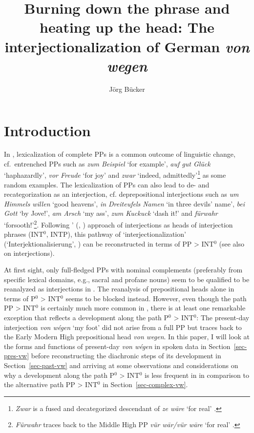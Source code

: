 \documentclass[output=paper
  ,nobabel
  ,draftmode
  ,babelshorthands
  ,colorlinks, citecolor=brown
]{langscibook}
\title[Burning down the phrase and heating up the head]{Burning down the phrase and heating up the head: The interjectionalization of German \emph{von wegen}}
\author{Jörg Bücker\orcid{0000-0003-4864-3374}\affiliation{Heinrich-Heine-Universität Düsseldorf}}
\begin{document}
\maketitle


\section{Introduction}\label{sec-intro-büc}

In , lexicalization of complete PPs is a common outcome of linguistic change, cf.\ entrenched PPs such as \emph{zum Beispiel} `for example', \emph{auf gut Glück} `haphazardly', \emph{vor Freude} `for joy'
and \emph{zwar} `indeed, admittedly'\footnote{\emph{Zwar} is a fused and decategorized descendant of \emph{ze wāre} `for real' \citep[cf.][1020]{Kluge2002}.}
as some random examples. The lexicalization of PPs can also lead to de- and recategorization as an interjection, cf.
deprepositional interjections such as \emph{um Himmels willen} `good heavens', \emph{in Dreiteufels Namen} `in three devils' name', \emph{bei Gott} `by Jove!', \emph{am Arsch} `my ass', \emph{zum Kuckuck} `dash it!' and \emph{fürwahr} `forsooth!'\footnote{\textit{Fürwahr} traces back to the Middle High  PP \emph{vür wār/vür wāre} `for real' \citep[cf.][927]{GrimmGrimm1878}.}. 
Following \citeauthor{Fries1992}' (\citeyear{Fries1992}, \citeyear{Fries22}) approach of interjections as heads of interjection phrases (INT$^0$, INTP), this pathway of `interjectionalization' (`Interjektionalisierung', \citealp{Nuebling2001}) can be reconstructed in terms of PP > INT$^0$ (see also \citealp{Ehlich1986,Reisigl1999,Nuebling2004} on interjections).

At first sight, only full-fledged PPs with nominal complements (preferably from specific lexical domains, e.g., sacral and profane nouns) seem to be qualified to be reanalyzed as interjections in . The reanalysis of prepositional heads alone in terms of P$^0$ > INT$^0$ seems to be blocked instead. However, even though the path PP > INT$^0$ is certainly much more common in , there is at least one remarkable exception that reflects a development along the path P$^0$ > INT$^0$: The present-day  interjection \emph{von wégen} `my foot' did not arise from a full PP but traces back to the Early Modern High  prepositional head \emph{von wegen}. In this paper, I will look at the forms and functions of present-day  \emph{von wégen} in spoken data in Section~\ref{sec-pres-vw} before reconstructing the diachronic steps of its development in Section~\ref{sec-past-vw} and arriving at some observations and considerations on why a development along the path P$^0$ > INT$^0$ is less frequent in  in comparison to the alternative path PP > INT$^0$ in Section~\ref{sec-complex-vw}.
\end{document}

